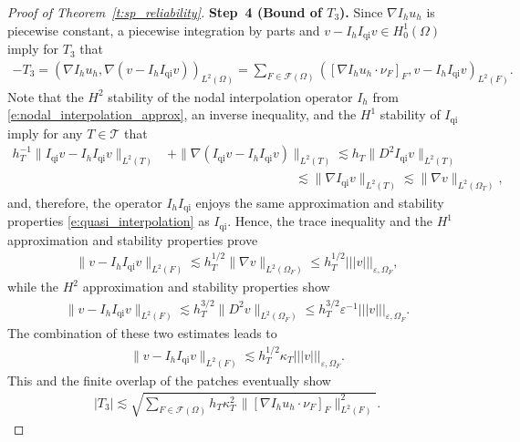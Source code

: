 \documentclass[a4paper]{amsart}
\theoremstyle{definition}
\numberwithin{equation}{section}
\numberwithin{theorem}{section}
\newcommand{\tri}{\mathcal{T}}
\newcommand{\ennorm}[1]{\lvert\!\lvert\!\lvert #1 \rvert\!\rvert\!\rvert}
\begin{document}
\begin{proof}[Proof of Theorem~\ref{t:sp_reliability}]
    \textbf{Step~4 (Bound of $T_3$).}
    Since $\nabla I_h u_h$ is piecewise constant, a piecewise integration
    by parts and $v-I_hI_\mathrm{qi}v\in H^1_0(\Omega)$ 
    imply for $T_3$ that
    \begin{align*}
        -T_3=
        (\nabla I_h u_h,\nabla (v-I_h I_\mathrm{qi} v))_{L^2(\Omega)}
        = \sum_{F\in\mathcal{F}(\Omega)}
          ([\nabla I_h u_h\cdot\nu_F]_F, v-I_h I_\mathrm{qi} v)_{L^2(F)}.
    \end{align*}
    Note that the $H^2$ stability of the nodal interpolation 
    operator $I_h$ from \eqref{e:nodal_interpolation_approx},
    an inverse inequality, and the $H^1$ stability of $I_\mathrm{qi}$ 
    imply for any $T\in\tri$ that 
    \begin{align*}
        h_T^{-1}\lVert I_\mathrm{qi} v-I_h I_\mathrm{qi}v\rVert_{L^2(T)} 
        &+ \lVert \nabla(I_\mathrm{qi} v-I_h I_\mathrm{qi}v)\rVert_{L^2(T)}
        \lesssim h_T \lVert D^2 I_\mathrm{qi} v\rVert_{L^2(T)} \\
        &\qquad\qquad\qquad \qquad\qquad
        \lesssim \lVert \nabla I_\mathrm{qi} v\rVert_{L^2(T)} 
        \lesssim \lVert \nabla  v\rVert_{L^2(\Omega_T)},
    \end{align*}
    and, therefore, the operator $I_h I_\mathrm{qi}$ enjoys the 
    same approximation and stability properties 
    \eqref{e:quasi_interpolation} as $I_\mathrm{qi}$.
    Hence, the trace inequality and the 
    $H^1$ approximation and stability properties prove 
    \begin{align*}
        \lVert v-I_h I_\mathrm{qi}v\rVert_{L^2(F)}
        \lesssim h_T^{1/2}\lVert \nabla v\rVert_{L^2(\Omega_F)}
        \leq h_T^{1/2} \ennorm{v}_{\varepsilon, \Omega_F},
    \end{align*}
   while the $H^2$ approximation and stability properties show 
    \begin{align*}
        \lVert v-I_h I_\mathrm{qi}v\rVert_{L^2(F)}
        \lesssim h_T^{3/2}\lVert D^2 v\rVert_{L^2(\Omega_F)}
        \leq h_T^{3/2}\varepsilon^{-1} \ennorm{v}_{\varepsilon, \Omega_F}.
    \end{align*}
    The combination of these two estimates leads to 
    \begin{align*}
        \lVert v-I_h I_\mathrm{qi}v\rVert_{L^2(F)}
        \lesssim h_T^{1/2}\kappa_T \ennorm{v}_{\varepsilon, \Omega_F}.
    \end{align*}
    This and the finite overlap of the patches
    eventually show
    \begin{align*}
        |T_3|
        \lesssim  \sqrt{\sum_{F\in\mathcal{F}(\Omega)}
          h_T\kappa_T^2
          \,\lVert [\nabla I_h u_h\cdot\nu_F]_F\rVert_{L^2(F)}^2}
          .
    \end{align*}
    

\end{proof}
\end{document}
